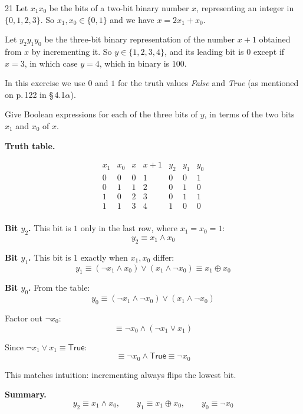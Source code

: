 \documentclass[11pt]{article}
\begin{document}
\begin{exercise}{21}
    Let $x_1 x_0$ be the bits of a two-bit binary number $x$,
    representing an integer in $\{0,1,2,3\}$. So $x_1, x_0 \in \{0,1\}$
    and we have $x = 2x_1 + x_0$.

    Let $y_2 y_1 y_0$ be the three-bit binary representation of the
    number $x+1$ obtained from $x$ by incrementing it. So
    $y \in \{1,2,3,4\}$, and its leading bit is $0$ except if $x = 3$,
    in which case $y = 4$, which in binary is $100$.

    In this exercise we use $0$ and $1$ for the truth values
    \textit{False} and \textit{True} (as mentioned on p.\,122 in
    \S\,4.1$\alpha$).

    Give Boolean expressions for each of the three bits of $y$, in
    terms of the two bits $x_1$ and $x_0$ of $x$.
\end{exercise}

\begin{solution}
\textbf{Truth table.}

\[
\begin{array}{cc|c|c|ccc}
x_1 & x_0 & x & x+1 & y_2 & y_1 & y_0 \\
\hline
0 & 0 & 0 & 1 & 0 & 0 & 1 \\
0 & 1 & 1 & 2 & 0 & 1 & 0 \\
1 & 0 & 2 & 3 & 0 & 1 & 1 \\
1 & 1 & 3 & 4 & 1 & 0 & 0 \\
\end{array}
\]

\bigskip
\textbf{Bit $y_2$.} This bit is $1$ only in the last row, where $x_1=x_0=1$:
\[
y_2 \equiv x_1\wedge x_0
\]

\bigskip
\textbf{Bit $y_1$.} This bit is $1$ exactly when $x_1,x_0$ differ:
\[
y_1 \equiv (\neg x_1\wedge x_0)\vee(x_1\wedge\neg x_0) \equiv x_1\oplus x_0
\]

\bigskip
\textbf{Bit $y_0$.} From the table:
\[
y_0 \equiv (\neg x_1\wedge\neg x_0)\vee(x_1\wedge\neg x_0)
\]

Factor out $\neg x_0$:
\[
\equiv \neg x_0 \wedge(\neg x_1\vee x_1)
\]

Since $\neg x_1\vee x_1\equiv\mathsf{True}$:
\[
\equiv \neg x_0\wedge\mathsf{True} \equiv \neg x_0
\]

This matches intuition: incrementing always flips the lowest bit.

\bigskip
\textbf{Summary.}
\[
y_2 \equiv x_1\wedge x_0, \qquad y_1\equiv x_1\oplus x_0, \qquad y_0\equiv \neg x_0
\]
\end{solution}
\end{document}
